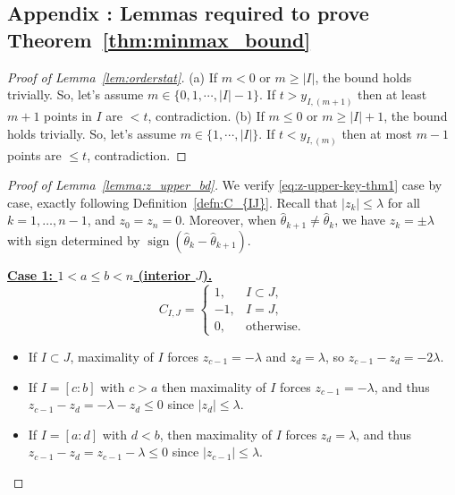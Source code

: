 \documentclass[11pt]{article}
\theoremstyle{plain}
\theoremstyle{definition}
\theoremstyle{remark}
\begin{document}
\bigskip
    
	\setlength{\bibsep}{0pt plus 0.25ex}
	
	

    

    \begin{appendix}
\section*{Appendix \thesection: Lemmas required to prove Theorem~\ref{thm:minmax_bound}}\label{appna}
\begin{proof}[Proof of Lemma~\ref{lem:orderstat}]
(a) If $m<0$ or $m\geq |I|$, the bound holds trivially. So, let's assume $m \in \{0,1,\cdots,|I|-1\}.$
If $t>y_{I,(m+1)}$ then at least $m+1$ points in $I$ are $<t$, contradiction.
(b) If $m\leq 0$ or $m\geq |I|+1$, the bound holds trivially. So, let's assume $m \in \{1,\cdots,|I|\}.$
If $t<y_{I,(m)}$ then at most $m-1$ points are $\le t$, contradiction.
\end{proof}

\begin{proof}[Proof of Lemma~\ref{lemma:z_upper_bd}]
   We verify \eqref{eq:z-upper-key-thm1} case by case, exactly following Definition~\ref{defn:C_{IJ}}.
Recall that $|z_k|\le\lambda$ for all $k=1,\dots,n-1$, and $z_0=z_n=0$. Moreover, when
$\hat\theta_{k+1}\neq\hat\theta_k$, we have $z_k=\pm\lambda$ with sign determined by
$\operatorname{sign}(\hat\theta_k-\hat\theta_{k+1})$.

\medskip
\noindent\underline{\textbf{Case 1: $1<a\le b<n$ (interior $J$).}}
\[
C_{I,J}=
\begin{cases}
1, & I\subset J,\\
-1, & I=J,\\
0, & \text{otherwise}.
\end{cases}
\]
\begin{itemize}
\item If $I\subset J$, maximality of $I$ forces $z_{c-1}=-\lambda$ and $z_d=\lambda$,
so $z_{c-1}-z_d=-2\lambda$.

\item If $I=[c:b]$ with $c > a$ then maximality of $I$ forces $z_{c-1}=-\lambda$, and thus
$z_{c-1}-z_d=-\lambda-z_d\le 0$ since $|z_d|\le \lambda.$

\item If $I=[a:d]$ with $d < b$, then maximality of $I$ forces $z_d=\lambda$, and thus
$z_{c-1}-z_d=z_{c-1}-\lambda\le 0$ since $|z_{c-1}|\le \lambda.$


\end{itemize}
\end{proof}
\end{appendix}
\end{document}
